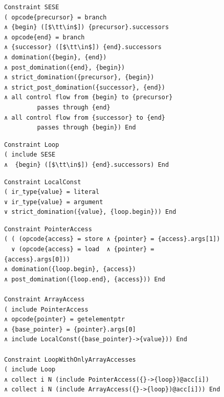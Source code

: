 \begin{figure}[p]
\begin{lstlisting}[language=CAnDL,basicstyle=\linespread{0.96}\ttfamily,
                   label={CAnDLSESE},caption=
   {Single entry single exit region in CAnDL:
    The region spans from {\tt begin} to {\tt end}, with the entry as control
    flow {\tt precursor} to {\tt begin}, and the exit as control flow {\tt end}
    to {\tt successor}.\parfillskip=0pt}]
Constraint SESE
( opcode{precursor} = branch
∧ {begin} ([$\tt\in$]) {precursor}.successors
∧ opcode{end} = branch
∧ {successor} ([$\tt\in$]) {end}.successors
∧ domination({begin}, {end})
∧ post_domination({end}, {begin})
∧ strict_domination({precursor}, {begin})
∧ strict_post_domination({successor}, {end})
∧ all control flow from {begin} to {precursor}
         passes through {end}
∧ all control flow from {successor} to {end}
         passes through {begin}) End
\end{lstlisting}
\begin{lstlisting}[language=CAnDL,basicstyle=\linespread{0.96}\ttfamily,
                   label={CAnDLLoop},caption=
   {Loops are defined in CAnDL as single entry single exit regions with a back
    edge.
    The back edge does not break the ``single exit'' condition, because it does
    not exit the region.\parfillskip=0pt}]
Constraint Loop
( include SESE
∧  {begin} ([$\tt\in$]) {end}.successors) End
\end{lstlisting}
\begin{lstlisting}[language=CAnDL,basicstyle=\linespread{0.96}\ttfamily,
                   label={localconstant},caption=
   {This specification restricts {\tt value} to remain constant during the
    execution of a loop.
    It is underspecified on its own, and should be included in larger CAnDL
    programs that also include {\tt Loop}, renaming {\tt value} to the specific
    variable that needs to be constrained in this way. \parfillskip=0pt}]
Constraint LocalConst
( ir_type{value} = literal
∨ ir_type{value} = argument
∨ strict_domination({value}, {loop.begin})) End
\end{lstlisting}
\begin{lstlisting}[language=CAnDL,basicstyle=\linespread{0.96}\ttfamily,
                   label={fig:arrayloop},caption=
   {Building blocks are combined to restrict the permitted memory access within
    a loop. \leftskip=0pt\rightskip=0pt}]
Constraint PointerAccess
( ( (opcode{access} = store ∧ {pointer} = {access}.args[1])
  ∨ (opcode{access} = load  ∧ {pointer} = {access}.args[0]))
∧ domination({loop.begin}, {access})
∧ post_domination({loop.end}, {access})) End

Constraint ArrayAccess
( include PointerAccess
∧ opcode{pointer} = getelementptr
∧ {base_pointer} = {pointer}.args[0]
∧ include LocalConst({base_pointer}->{value})) End

Constraint LoopWithOnlyArrayAccesses
( include Loop
∧ collect i N (include PointerAccess({}->{loop})@acc[i])
∧ collect i N (include ArrayAccess({}->{loop})@acc[i])) End
\end{lstlisting}
\end{figure}

